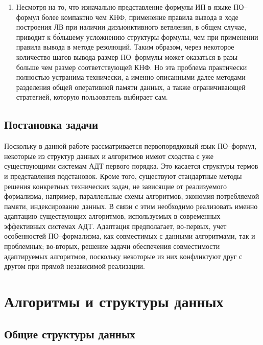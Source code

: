\begin{enumerate}
\item Несмотря на то, что изначально представление формулы ИП в языке ПО--формул более компактно чем КНФ, применение правила вывода в ходе построения ЛВ при наличии дизъюнктивного ветвления, в общем случае, приводит к б\'{о}льшему усложнению структуры формулы, чем при применении правила вывода в методе резолюций. Таким образом, через некоторое количество шагов вывода размер ПО--формулы может оказаться в разы больше чем размер соответствующей КНФ. Но эта проблема практически полностью устранима технически, а именно описанными далее методами разделения общей оперативной памяти данных, а также ограничивающей стратегией, которую пользователь выбирает сам.
\end{enumerate}

\subsection{Постановка задачи}
Поскольку в данной работе рассматривается первопорядковый язык ПО--формул, некоторые из структур данных и алгоритмов имеют сходства с уже существующими системам АДТ первого порядка. Это касается структуры термов и представления подстановок. Кроме того, существуют стандартные методы решения конкретных технических задач, не зависящие от реализуемого формализма, например, параллельные схемы алгоритмов, экономия потребляемой памяти, индексирование данных. В связи с этим необходимо реализовать именно адаптацию существующих алгоритмов, используемых в современных эффективных системах АДТ. Адаптация предполагает, во-первых, учет особенностей ПО--формализма, как совместимых с данными алгоритмами, так и проблемных; во-вторых, решение задачи обеспечения совместимости адаптируемых алгоритмов, поскольку некоторые из них конфликтуют друг с другом при прямой независимой реализации.



\section{Алгоритмы и структуры данных}

\subsection{Общие структуры данных}

